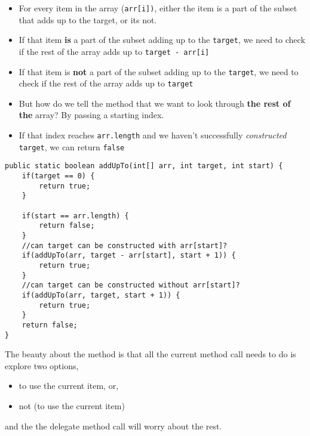 \begin{itemize}
  \item For every item in the array (\texttt{arr[i])}, either the item is a part of the subset that adds up to the target, or its not.
  \item If that item \textbf{is} a part of the subset adding up to the \texttt{target}, we need to check if the rest of the array adds up to \texttt{target - arr[i]}
  \item If that item is \textbf{not} a part of the subset adding up to the \texttt{target}, we need to check if the rest of the array adds up to \texttt{target}
  \item But how do we tell the method that we want to look through \textbf{the rest of the} array? By passing a starting index.
  \item If that index reaches \texttt{arr.length} and we haven't successfully \textit{constructed} \texttt{target}, we can return \texttt{false}
\end{itemize}

\newpage

\begin{lstlisting}
public static boolean addUpTo(int[] arr, int target, int start) {
	if(target == 0) {
		return true;
	}
	
	if(start == arr.length) {
		return false;
	}
	//can target can be constructed with arr[start]?
	if(addUpTo(arr, target - arr[start], start + 1)) {
		return true;
	}
	//can target can be constructed without arr[start]?
	if(addUpTo(arr, target, start + 1)) {
		return true;
	}
	return false;
}
\end{lstlisting}

The beauty about the method is that all the current method call needs to do is explore two options, 

\begin{itemize}
  \item to use the current item, or,
  \item not (to use the current item)
\end{itemize}

and the the delegate method call will worry about the rest.


